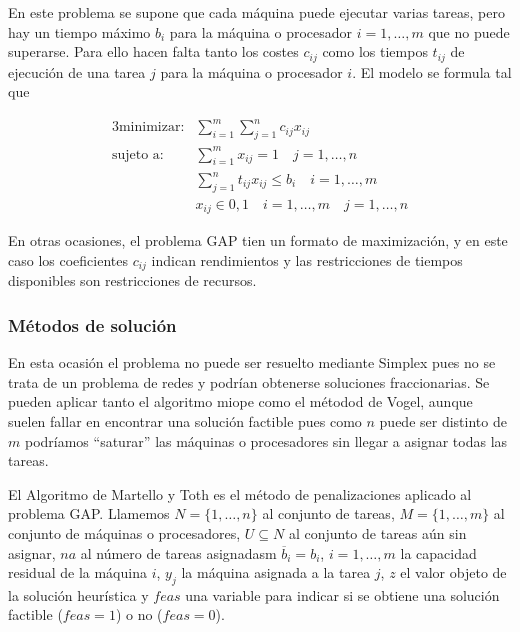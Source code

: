 En este problema se supone que cada máquina puede ejecutar varias tareas, pero hay un tiempo máximo $b_i$ para la máquina o 
procesador $i=1,\dots,m$ que no puede superarse. Para ello hacen falta tanto los costes $c_{ij}$ como los tiempos $t_{ij}$ de
ejecución de una tarea $j$ para la máquina o procesador $i$. El modelo se formula tal que

\begin{alignat}{3}
    \text{minimizar:}   &   \sum_{i=1}^m\sum_{j=1}^n c_{ij}x_{ij}               \\
    \text{sujeto a:}    &   \sum_{i=1}^m x_{ij}=1 \quad j=1,\dots,n             \\
                        &   \sum_{j=1}^n t_{ij}x_{ij}\leq b_i \quad i=1,\dots,m \\
                        &   x_{ij} \in {0, 1} \quad i=1,\dots,m \quad j=1,\dots,n
\end{alignat}

En otras ocasiones, el problema GAP tien un formato de maximización, y en este caso los coeficientes $c_{ij}$ indican
rendimientos y las restricciones de tiempos disponibles son restricciones de recursos.

\subsubsection{Métodos de solución}

En esta ocasión el problema no puede ser resuelto mediante Simplex pues no se trata de un problema de redes y podrían obtenerse
soluciones fraccionarias. Se pueden aplicar tanto el algoritmo miope como el métodod de Vogel, aunque suelen fallar en 
encontrar una solución factible pues como $n$ puede ser distinto de $m$ podríamos ``saturar'' las máquinas o procesadores sin
llegar a asignar todas las tareas. 

\newpage

El Algoritmo de Martello y Toth es el método de penalizaciones aplicado al problema GAP. Llamemos $N=\{1,\dots,n\}$ al conjunto
de tareas, $M=\{1,\dots,m\}$ al conjunto de máquinas o procesadores, $U\subseteq N$ al conjunto de tareas aún sin asignar, $na$
al número de tareas asignadasm $\overline{b}_i=b_i$, $i=1,\dots,m$ la capacidad residual de la máquina $i$, $y_j$ la máquina
asignada a la tarea $j$, $z$ el valor objeto de la solución heurística y $feas$ una variable para indicar si se obtiene una
solución factible ($feas=1$) o no ($feas=0$).

